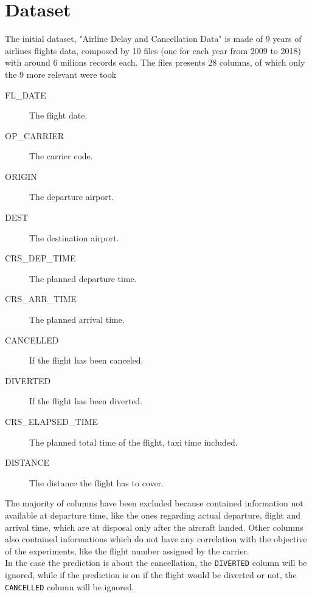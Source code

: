 \documentclass[
	letterpaper, %
	10pt, %
]{class}
\begin{document}

\section{Dataset}

The initial dataset, "Airline Delay and Cancellation Data" \cite{dataset} is made of 9 years of airlines flights data, composed by 10 files (one for each year from 2009 to 2018) with around 6 milions records each.
The files presents 28 columns, of which only the 9 more relevant were took\\

\begin{description}
    \item[FL\_DATE] The flight date.
    \item[OP\_CARRIER] The carrier code.
    \item[ORIGIN] The departure airport.
    \item[DEST] The destination airport.
    \item[CRS\_DEP\_TIME] The planned departure time.
    \item[CRS\_ARR\_TIME] The planned arrival time.
    \item[CANCELLED] If the flight has been canceled.
    \item[DIVERTED] If the flight has been diverted.
    \item[CRS\_ELAPSED\_TIME] The planned total time of the flight, taxi time included.
    \item[DISTANCE] The distance the flight has to cover.\\
\end{description}

The majority of columns have been excluded because contained information not available at departure time, like the ones regarding actual departure, flight and arrival time, which are at disposal only after the aircraft landed.
Other columns also contained informations which do not have any correlation with the objective of the experiments, like the flight number assigned by the carrier.\\

In the case the prediction is about the cancellation, the \texttt{DIVERTED} column will be ignored, while if the prediction is on if the flight would be diverted or not, the \texttt{CANCELLED} column will be ignored.\\
\end{document}
